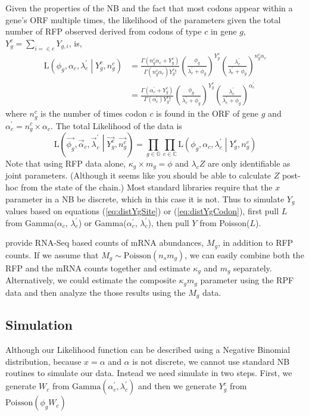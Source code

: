\documentclass{article}
\newcommand{\alphac}{\ensuremath{{\alpha_c}}\xspace}
\newcommand{\alphacprime}{\ensuremath{{\alpha_c^\prime}}\xspace}
\newcommand{\alphacvec}{\ensuremath{{\vec{\alpha}_c}}\xspace}
\newcommand{\lambdac}{\ensuremath{{\lambda_c}}\xspace}
\newcommand{\lambdacprime}{\ensuremath{{\lambda_c^\prime}}\xspace}
\newcommand{\lambdacprimevec}{\ensuremath{{\vec{\lambda}_c^\prime}}\xspace}
\newcommand{\ngc}{\ensuremath{{n_{g}^c}}\xspace}
\newcommand{\ns}{\ensuremath{{n_s}}\xspace}
\newcommand{\mg}{\ensuremath{{m_g}}\xspace}
\newcommand{\Mg}{\ensuremath{{M_g}}\xspace}
\newcommand{\phig}{\ensuremath{{\phi_g}}\xspace}
\newcommand{\kappag}{\ensuremath{{\kappa_{g}}}\xspace}
\newcommand{\Ztheta}{\ensuremath{{Z}}\xspace}
\newcommand{\Yg}{\ensuremath{{Y_{g}}}\xspace}
\newcommand{\Ygi}{\ensuremath{{Y_{g,i}}}\xspace}
\newcommand{\Ygc}{\ensuremath{{Y_{g}^c}}\xspace}
\newcommand{\Lik}{\ensuremath{\text{L}}\xspace}
\newcommand{\setG}{\ensuremath{\mathbb{G}}\xspace}
\newcommand{\setC}{\ensuremath{\mathbb{C}}\xspace}
\newcommand{\Ygcvec}{\ensuremath{{\Vec{\Ygc}}}\xspace}
\newcommand{\ngcvec}{\ensuremath{{\Vec{\ngc}}}\xspace}
\newcommand{\phigvec}{\ensuremath{{\Vec{\phig}}}\xspace}
\begin{document}
Given the properties of the NB and the fact that most codons appear within a gene's ORF multiple times, the likelihood of the parameters given the total number of RFP observed derived from codons of type $c$ in gene $g$, $\Ygc = \sum_{i=\in c} \Ygi$, is,
\begin{align}
  \Lik\left(\phig, \alphac, \lambdacprime \middle| \Ygc, \ngc\right) &= \frac{\Gamma\left(\ngc \alphac + \Ygc\right)}{\Gamma\left(\ngc \alphac\right) \Ygc!} 
  \left(\frac{\phig}{\lambdacprime + \phig}\right)^\Ygc \left(\frac{\lambdacprime}{\lambdacprime + \phig}\right)^{\ngc \alphac}\\
\label{eq:distYgCodon}&= \frac{\Gamma\left(\alphacprime + \Ygc\right)}{\Gamma\left(\alphacprime\right) \Ygc!} 
  \left(\frac{\phig}{\lambdacprime + \phig}\right)^\Ygc \left(\frac{\lambdacprime}{\lambdacprime + \phig}\right)^{\alphacprime}
\end{align}
where $\ngc$ is the number of times codon $c$ is found in the ORF of gene $g$ and $\alphacprime = \ngc \times \alphac$.
The total Likelihood of the data is
\begin{equation}
  \Lik\left(\phigvec, \alphacvec, \lambdacprimevec \middle| \Ygcvec, \ngcvec\right) = \prod_{g \in \setG} \prod_{c \in \setC}  \Lik\left(\phig, \alphac, \lambdacprime \middle| \Ygc, \ngc\right)
\end{equation}
Note that using RFP data alone, $\kappag \times \mg = \phi$ and $\lambdac \Ztheta$ are only identifiable as joint parameters. 
(Although it seems like you should be able to calculate \Ztheta post-hoc from the state of the chain.)
Most standard libraries require that the $x$ parameter in a NB be discrete, which in this case it is not.
Thus to simulate \Yg values based on equations (\ref{eq:distYgSite}) or (\ref{eq:distYgCodon}), first pull $L$ from Gamma(\alphac, \lambdacprime) or Gamma(\alphacprime, \lambdacprime), then pull $Y$ from Poisson($L$).
  
\citet{PopEtAl14} provide RNA-Seq based counts of mRNA abundances, \Mg, in addition to RFP counts.
If we assume that $\Mg \sim \text{Poisson}(\ns \mg)$, we can easily combine both the RFP and the mRNA counts together and estimate $\kappag$ and $\mg$ separately.
Alternatively, we could estimate the composite \kappag \mg parameter using the RPF data and then analyze the those results using the \Mg data.

\subsection*{Simulation}
Although our Likelihood function can be described using a Negative Binomial distribution, because $x = \alpha$ and $\alpha$ is not discrete, we cannot use standard NB routines to simulate our data.
Instead we need simulate in two steps.
First, we generate $W_c$  from $\text{Gamma}(\alphacprime, \lambdacprime)$ and then we generate $\Ygc$ from $\text{Poisson}\left(\phi_g W_c\right)$
\end{document}
